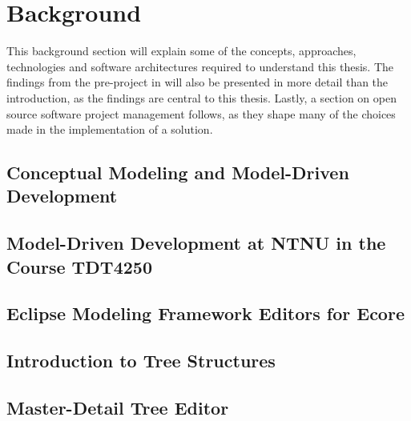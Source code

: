 \chapter{Background}\label{chap:background}

This background section will explain some of the concepts, approaches, technologies and software architectures required to understand this thesis.
The findings from the pre-project in \cite{rekstadModelingEnvironmentCloud2020} will also be presented in more detail than the introduction, as the findings are central to this thesis.
Lastly, a section on open source software project management follows, as they shape many of the choices made in the implementation of a solution.

\section{Conceptual Modeling and Model-Driven Development}\label{sec:conceptual-modeling}




\section{Model-Driven Development at NTNU in the Course TDT4250}\label{sec:tdt4250}




\section{Eclipse Modeling Framework Editors for Ecore}\label{sec:emf-editors}




\section{Introduction to Tree Structures}\label{sec:tree-structures}




\section{Master-Detail Tree Editor}\label{sec:master-detail}




